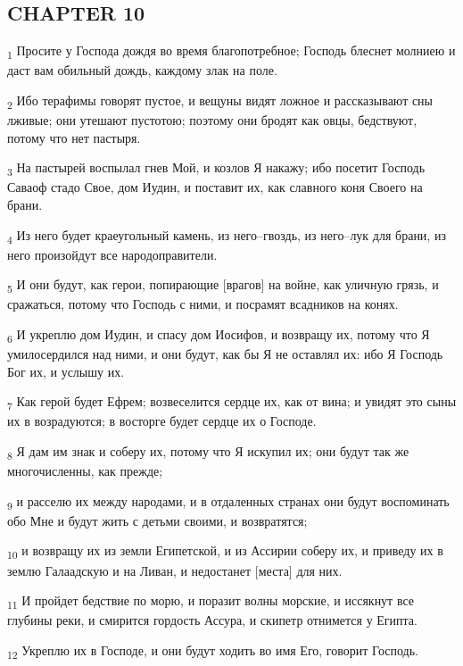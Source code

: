 \subsection{CHAPTER 10}
\begin{tcolorbox}
\textsubscript{1} Просите у Господа дождя во время благопотребное; Господь блеснет молниею и даст вам обильный дождь, каждому злак на поле.
\end{tcolorbox}
\begin{tcolorbox}
\textsubscript{2} Ибо терафимы говорят пустое, и вещуны видят ложное и рассказывают сны лживые; они утешают пустотою; поэтому они бродят как овцы, бедствуют, потому что нет пастыря.
\end{tcolorbox}
\begin{tcolorbox}
\textsubscript{3} На пастырей воспылал гнев Мой, и козлов Я накажу; ибо посетит Господь Саваоф стадо Свое, дом Иудин, и поставит их, как славного коня Своего на брани.
\end{tcolorbox}
\begin{tcolorbox}
\textsubscript{4} Из него будет краеугольный камень, из него--гвоздь, из него--лук для брани, из него произойдут все народоправители.
\end{tcolorbox}
\begin{tcolorbox}
\textsubscript{5} И они будут, как герои, попирающие [врагов] на войне, как уличную грязь, и сражаться, потому что Господь с ними, и посрамят всадников на конях.
\end{tcolorbox}
\begin{tcolorbox}
\textsubscript{6} И укреплю дом Иудин, и спасу дом Иосифов, и возвращу их, потому что Я умилосердился над ними, и они будут, как бы Я не оставлял их: ибо Я Господь Бог их, и услышу их.
\end{tcolorbox}
\begin{tcolorbox}
\textsubscript{7} Как герой будет Ефрем; возвеселится сердце их, как от вина; и увидят это сыны их в возрадуются; в восторге будет сердце их о Господе.
\end{tcolorbox}
\begin{tcolorbox}
\textsubscript{8} Я дам им знак и соберу их, потому что Я искупил их; они будут так же многочисленны, как прежде;
\end{tcolorbox}
\begin{tcolorbox}
\textsubscript{9} и расселю их между народами, и в отдаленных странах они будут воспоминать обо Мне и будут жить с детьми своими, и возвратятся;
\end{tcolorbox}
\begin{tcolorbox}
\textsubscript{10} и возвращу их из земли Египетской, и из Ассирии соберу их, и приведу их в землю Галаадскую и на Ливан, и недостанет [места] для них.
\end{tcolorbox}
\begin{tcolorbox}
\textsubscript{11} И пройдет бедствие по морю, и поразит волны морские, и иссякнут все глубины реки, и смирится гордость Ассура, и скипетр отнимется у Египта.
\end{tcolorbox}
\begin{tcolorbox}
\textsubscript{12} Укреплю их в Господе, и они будут ходить во имя Его, говорит Господь.
\end{tcolorbox}
